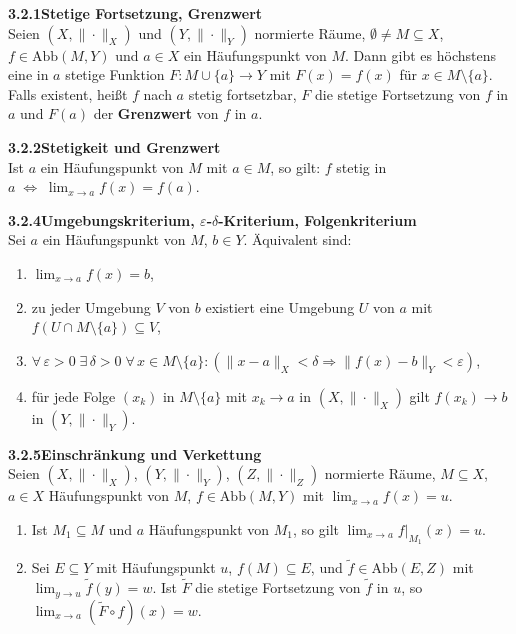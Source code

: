 \documentclass[a4paper,12pt]{article}
\newcommand{\gentry}[3]{%
  \noindent\textbf{#1\quad #2}\nopagebreak\\[0.2em]
  #3\par\smallskip
}
\begin{document}
\gentry{3.2.1}{Stetige Fortsetzung, Grenzwert}{%
  Seien $(X, \|\cdot\|_X)$ und $(Y, \|\cdot\|_Y)$ normierte R\"aume,
  $\emptyset \neq M \subseteq X$, $f \in \mathrm{Abb}(M, Y)$ und $a \in X$ ein
  H\"aufungspunkt von $M$. Dann gibt es h\"ochstens eine in $a$ stetige Funktion
  $F : M \cup \{a\} \to Y$ mit $F(x) = f(x)$ f\"ur $x \in M \setminus \{a\}$.
  Falls existent, hei{\ss}t $f$ nach $a$ stetig fortsetzbar, $F$ die stetige
  Fortsetzung von $f$ in $a$ und $F(a)$ der \textbf{Grenzwert} von $f$ in $a$.
}

\gentry{3.2.2}{Stetigkeit und Grenzwert}{%
  Ist $a$ ein H\"aufungspunkt von $M$ mit $a \in M$, so gilt:
  $f$ stetig in $a \;\Leftrightarrow\; \lim_{x \to a} f(x) = f(a)$.
}

\gentry{3.2.4}{Umgebungskriterium, $\varepsilon$-$\delta$-Kriterium, Folgenkriterium}{%
  Sei $a$ ein H\"aufungspunkt von $M$, $b \in Y$. \"Aquivalent sind:
  \begin{enumerate}[label=(\roman*),topsep=2pt,itemsep=1pt]
    \item $\lim_{x \to a} f(x) = b$,
    \item zu jeder Umgebung $V$ von $b$ existiert eine Umgebung $U$ von $a$ mit
          $f(U \cap M \setminus \{a\}) \subseteq V$,
    \item $\forall\, \varepsilon > 0 \; \exists\, \delta > 0 \; \forall\, x \in M \setminus \{a\}:
          (\|x - a\|_X < \delta \Rightarrow \|f(x) - b\|_Y < \varepsilon)$,
    \item f\"ur jede Folge $(x_k)$ in $M \setminus \{a\}$ mit $x_k \to a$ in $(X, \|\cdot\|_X)$
          gilt $f(x_k) \to b$ in $(Y, \|\cdot\|_Y)$.
  \end{enumerate}
}

\gentry{3.2.5}{Einschr\"ankung und Verkettung}{%
  Seien $(X, \|\cdot\|_X)$, $(Y, \|\cdot\|_Y)$, $(Z, \|\cdot\|_Z)$ normierte R\"aume,
  $M \subseteq X$, $a \in X$ H\"aufungspunkt von $M$, $f \in \mathrm{Abb}(M, Y)$ mit
  $\lim_{x \to a} f(x) = u$.
  \begin{enumerate}[label=(\roman*),topsep=2pt,itemsep=1pt]
    \item Ist $M_1 \subseteq M$ und $a$ H\"aufungspunkt von $M_1$, so gilt
          $\lim_{x \to a} f|_{M_1}(x) = u$.
    \item Sei $E \subseteq Y$ mit H\"aufungspunkt $u$, $f(M) \subseteq E$, und
          $\tilde f \in \mathrm{Abb}(E, Z)$ mit $\lim_{y \to u} \tilde f(y) = w$.
          Ist $\tilde F$ die stetige Fortsetzung von $\tilde f$ in $u$, so
          $\lim_{x \to a}(\tilde F \circ f)(x) = w$.
  \end{enumerate}
}
\end{document}
